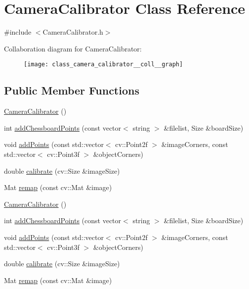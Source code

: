 \hypertarget{class_camera_calibrator}{\section{Camera\-Calibrator Class Reference}
\label{class_camera_calibrator}
}


{\ttfamily \#include $<$Camera\-Calibrator.\-h$>$}



Collaboration diagram for Camera\-Calibrator\-:\nopagebreak
\begin{figure}[H]
\begin{center}
\leavevmode
\texttt{[image: class\_camera\_calibrator\_\_coll\_\_graph]}
\end{center}
\end{figure}
\subsection*{Public Member Functions}
\begin{DoxyCompactItemize}
\item 
\hyperlink{class_camera_calibrator_a7774e5cf52111648fe91d50adbb2b6de}{Camera\-Calibrator} ()
\item 
int \hyperlink{class_camera_calibrator_a525d73f2da64eb204f7b18869366d3fb}{add\-Chessboard\-Points} (const vector$<$ string $>$ \&filelist, Size \&board\-Size)
\item 
void \hyperlink{class_camera_calibrator_afd58e42b53941ef5e1dade637f90f5b4}{add\-Points} (const std\-::vector$<$ cv\-::\-Point2f $>$ \&image\-Corners, const std\-::vector$<$ cv\-::\-Point3f $>$ \&object\-Corners)
\item 
double \hyperlink{class_camera_calibrator_acf70d5b8a2e8eb17822e864ad936ae3f}{calibrate} (cv\-::\-Size \&image\-Size)
\item 
Mat \hyperlink{class_camera_calibrator_af1b2cff3d345a70bbc5421c20847b14f}{remap} (const cv\-::\-Mat \&image)
\item 
\hyperlink{class_camera_calibrator_a7774e5cf52111648fe91d50adbb2b6de}{Camera\-Calibrator} ()
\item 
int \hyperlink{class_camera_calibrator_a525d73f2da64eb204f7b18869366d3fb}{add\-Chessboard\-Points} (const vector$<$ string $>$ \&filelist, Size \&board\-Size)
\item 
void \hyperlink{class_camera_calibrator_afd58e42b53941ef5e1dade637f90f5b4}{add\-Points} (const std\-::vector$<$ cv\-::\-Point2f $>$ \&image\-Corners, const std\-::vector$<$ cv\-::\-Point3f $>$ \&object\-Corners)
\item 
double \hyperlink{class_camera_calibrator_acf70d5b8a2e8eb17822e864ad936ae3f}{calibrate} (cv\-::\-Size \&image\-Size)
\item 
Mat \hyperlink{class_camera_calibrator_aecc1991d46487c6e305f95101e8f9bd2}{remap} (const cv\-::\-Mat \&image)
\end{DoxyCompactItemize}


